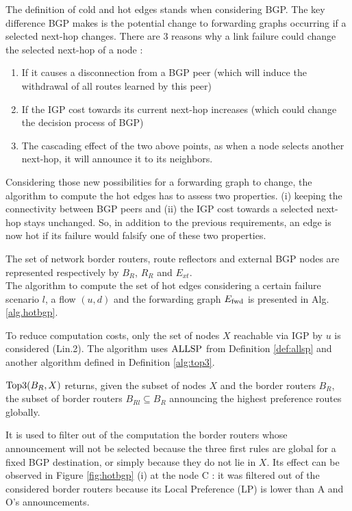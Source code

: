 The definition of cold and hot edges stands when considering BGP.
The key difference BGP makes is the potential change to forwarding graphs occurring if a selected next-hop changes.
There are 3 reasons why a link failure could change the selected next-hop of a node :
\begin{enumerate}
  \item If it causes a disconnection from a BGP peer (which will induce the withdrawal of all routes learned by this peer) 
  \item If the IGP cost towards its current next-hop increases (which could change the decision process of BGP)
  \item The cascading effect of the two above points, as when a node selects another next-hop, it will announce it to its neighbors.
\end{enumerate}

Considering those new possibilities for a forwarding graph to change, the algorithm to compute the hot edges has to assess two properties. (i) keeping the connectivity between BGP peers and (ii) the IGP cost towards a selected next-hop stays unchanged.
So, in addition to the previous requirements, an edge is now hot if its failure would falsify one of these two properties.


The set of network border routers, route reflectors and external BGP nodes are represented respectively by $B_R$, $R_R$ and $E_{xt}$.\\
The algorithm to compute the set of hot edges considering a certain failure scenario $l$, a flow $(u, d)$ and the forwarding graph $E_\textnormal{fwd}$ is presented in	Alg. \ref{alg.hotbgp}.

To reduce computation costs, only the set of nodes $X$ reachable via IGP by $u$ is considered (Lin.2).
The algorithm uses $\textnormal{ALLSP}$ from Definition \ref{def:allsp} and another algorithm defined in Definition \ref{alg:top3}.

\begin{definition}$\textnormal{Top3}(B_R,X)$\label{alg:top3}
	returns, given the subset of nodes $X$ and the border routers $B_R$, the subset of border routers $B_{Rl} \subseteq B_R$ announcing the highest preference routes globally.   
\end{definition}

It is used to filter out of the computation the border routers whose announcement will not be selected because the three first rules are global for a fixed BGP destination, or simply because they do not lie in $X$. 
Its effect can be observed in Figure \ref{fig:hotbgp} (i) at the node C : it was filtered out of the considered border routers because its Local Preference (LP) is lower than A and O's announcements.  

